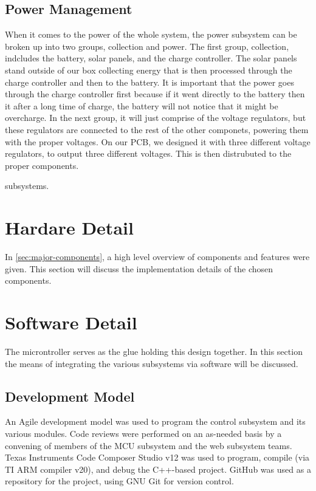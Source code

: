 \documentclass[journal]{IEEEtran}
\begin{document}
\subsection{Power Management} \label{sec:power management}
When it comes to the power of the whole system, the power subsystem can be broken up into two groups, collection 
and power. The first group, collection, indcludes the battery, solar panels, and the charge controller. 
The solar panels stand outside of our box collecting energy that is then processed through the charge 
controller and then to the battery. It is important that the power goes through the charge controller first 
because if it went directly to the battery then it after a long time of charge, the battery will not notice 
that it might be overcharge. In the next group, it will just comprise of the voltage regulators, but these 
regulators are connected to the rest of the other componets, powering them with the proper voltages. On our 
PCB, we designed it with three different voltage regulators, to output three different voltages. This is then 
distrubuted to the proper components.

subsystems. 
\section{Hardare Detail}
In \autoref{sec:major-components}, a high level overview of components and features were given. This
section will discuss the implementation details of the chosen components.
\section{Software Detail}
The microntroller serves as the glue holding this design together. In this section the means of
integrating the various subsystems via software will be discussed.
\subsection{Development Model}
An Agile development model was used to program the control subsystem and its various modules. Code reviews were performed on an as-needed basis by a convening of members of the MCU subsystem and the web subsystem teams. Texas Instruments Code Composer Studio v12 was used to program, compile (via TI ARM compiler v20), and debug the C++-based project. GitHub was used as a repository for the project, using GNU Git for version control.
\end{document}
